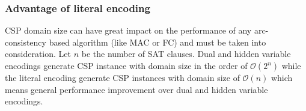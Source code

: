 \subsubsection{Advantage of literal encoding}
CSP domain size can have great impact on the performance of any arc-consistency based algorithm (like MAC or FC) and must be taken into consideration. Let $n$ be the number of SAT clauses. Dual and hidden variable encodings generate CSP instance with domain size in the order of $\mathcal{O}(2^n)$ while the literal encoding generate CSP instances with domain size of $\mathcal{O}(n)$ which means general performance improvement over dual and hidden variable encodings.
 